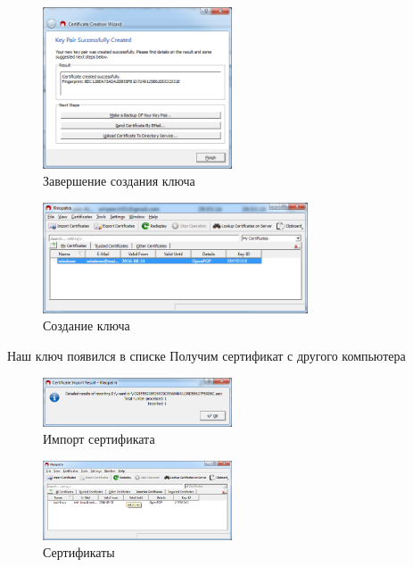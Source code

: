\begin{figure}[!ht]
	\centering
	\includegraphics[width=0.5\textwidth]{images/6.png}
	\caption{Завершение создания ключа}
\end{figure}


\begin{figure}[!ht]
	\centering
	\includegraphics[width=0.7\textwidth]{images/7.png}
	\caption{Создание ключа}
\end{figure}

\newpage
Наш ключ появился в списке
Получим сертификат с другого компьютера
\begin{figure}[!ht]
	\centering
	\includegraphics[width=0.5\textwidth]{images/8.png}
	\caption{Импорт сертификата}
\end{figure}

\begin{figure}[!ht]
	\centering
	\includegraphics[width=0.5\textwidth]{images/9.png}
	\caption{Сертификаты}
\end{figure}

